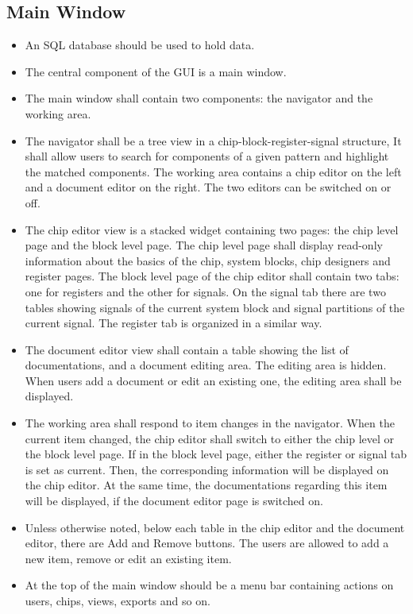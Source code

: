 \subsection{Main Window}
\begin{itemize}
\item An SQL database should be used to hold data.
\item The central component of the GUI is a main window.
\item The main window shall contain two components: the navigator and the working area.
\item The navigator shall be a tree view in a chip-block-register-signal structure, It shall allow users to search for components of a given pattern and highlight the matched components. The working area contains a chip editor on the left and a document editor on the right. The two editors can be switched on or off.
\item The chip editor view is a stacked widget containing two pages: the chip level page and the block level page. The chip level page shall display read-only information about the basics of the chip, system blocks, chip designers and register pages. The block level page of the chip editor shall contain two tabs: one for registers and the other for signals. On the signal tab there are two tables showing signals of the current system block and signal partitions of the current signal. The register tab is organized in a similar way.
\item The document editor view shall contain a table showing the list of documentations, and a document editing area. The editing area is hidden. When users add a document or edit an existing one, the editing area shall be displayed.
\item The working area shall respond to item changes in the navigator. When the current item changed, the chip editor shall switch to either the chip level or the block level page. If in the block level page, either the register or signal tab is set as current. Then, the corresponding information will be displayed on the chip editor. At the same time, the documentations regarding this item will be displayed, if the document editor page is switched on.
\item Unless otherwise noted, below each table in the chip editor and the document editor, there are Add and Remove buttons. The users are allowed to add a new item, remove or edit an existing item. 
\item At the top of the main window should be a menu bar containing actions on users, chips, views, exports and so on.
\end{itemize}
